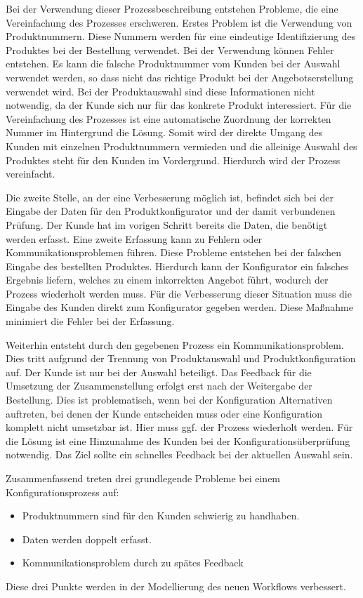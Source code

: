 Bei der Verwendung dieser Prozessbeschreibung entstehen Probleme, die eine Vereinfachung des Prozesses erschweren. Erstes Problem ist die Verwendung von Produktnummern. Diese Nummern werden für eine eindeutige Identifizierung des Produktes bei der Bestellung verwendet. Bei der Verwendung können Fehler entstehen. Es kann die falsche Produktnummer vom Kunden bei der Auswahl verwendet werden, so dass nicht das richtige Produkt bei der Angebotserstellung verwendet wird. Bei der Produktauswahl sind 
diese Informationen nicht notwendig, da der Kunde sich nur für das konkrete Produkt interessiert. Für die Vereinfachung des Prozesses ist eine automatische Zuordnung der korrekten Nummer im Hintergrund die Lösung. Somit wird der direkte Umgang des Kunden mit einzelnen Produktnummern vermieden und die alleinige Auswahl des Produktes steht für den Kunden im Vordergrund. Hierdurch wird der Prozess vereinfacht. \par

Die zweite Stelle, an der eine Verbesserung möglich ist, befindet sich bei der Eingabe der Daten für den Produktkonfigurator und der damit verbundenen Prüfung. Der Kunde hat im vorigen Schritt bereits die Daten, die benötigt werden erfasst. Eine zweite Erfassung kann zu Fehlern oder Kommunikationsproblemen führen. Diese Probleme entstehen bei der falschen Eingabe des bestellten Produktes. Hierdurch kann der Konfigurator ein falsches Ergebnis liefern, welches zu einem inkorrekten Angebot führt, wodurch der Prozess wiederholt werden muss. Für die Verbesserung dieser Situation muss die Eingabe des Kunden direkt zum Konfigurator gegeben werden. Diese Maßnahme minimiert die Fehler bei der Erfassung. 

Weiterhin entsteht durch den gegebenen Prozess ein Kommunikationsproblem. Dies tritt aufgrund der Trennung von Produktauswahl und Produktkonfiguration auf. Der Kunde ist nur bei der Auswahl beteiligt. Das Feedback für die Umsetzung der Zusammenstellung erfolgt erst nach der Weitergabe der Bestellung. Dies ist problematisch, wenn bei der Konfiguration Alternativen auftreten, bei denen der Kunde entscheiden muss oder eine Konfiguration komplett nicht umsetzbar ist. Hier muss ggf. der Prozess wiederholt werden. Für die Lösung ist eine Hinzunahme des Kunden bei der Konfigurationsüberprüfung notwendig. Das Ziel sollte ein schnelles Feedback bei der aktuellen Auswahl sein. 

Zusammenfassend treten drei grundlegende Probleme bei einem Konfigurationsprozess auf:
\begin{itemize}
        \item Produktnummern sind für den Kunden schwierig zu handhaben.
        
        \item Daten werden doppelt erfasst.
        
        \item Kommunikationsproblem durch zu spätes Feedback
\end{itemize}
Diese drei Punkte werden in der Modellierung des neuen Workflows verbessert.

